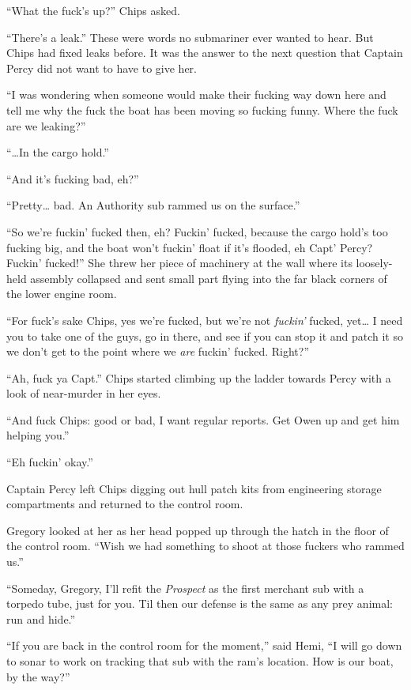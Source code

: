 \documentclass[
]{scrbook}
\begin{document}
``What the fuck's up?'' Chips asked.

``There's a leak.'' These were words no submariner ever wanted to hear.
But Chips had fixed leaks before. It was the answer to the next question
that Captain Percy did not want to have to give her.

``I was wondering when someone would make their fucking way down here
and tell me why the fuck the boat has been moving so fucking funny.
Where the fuck are we leaking?''

``\ldots In the cargo hold.''

``And it's fucking bad, eh?''

``Pretty\ldots{} bad. An Authority sub rammed us on the surface.''

``So we're fuckin' fucked then, eh? Fuckin' fucked, because the cargo
hold's too fucking big, and the boat won't fuckin' float if it's
flooded, eh Capt' Percy? Fuckin' fucked!'' She threw her piece of
machinery at the wall where its loosely-held assembly collapsed and sent
small part flying into the far black corners of the lower engine room.

``For fuck's sake Chips, yes we're fucked, but we're not \emph{fuckin'}
fucked, yet\ldots{} I need you to take one of the guys, go in there, and
see if you can stop it and patch it so we don't get to the point where
we \emph{are} fuckin' fucked. Right?''

``Ah, fuck ya Capt.'' Chips started climbing up the ladder towards Percy
with a look of near-murder in her eyes.

``And fuck Chips: good or bad, I want regular reports. Get Owen up and
get him helping you.''

``Eh fuckin' okay.''

Captain Percy left Chips digging out hull patch kits from engineering
storage compartments and returned to the control room.

Gregory looked at her as her head popped up through the hatch in the
floor of the control room. ``Wish we had something to shoot at those
fuckers who rammed us.''

``Someday, Gregory, I'll refit the \emph{Prospect} as the first merchant
sub with a torpedo tube, just for you. Til then our defense is the same
as any prey animal: run and hide.''

``If you are back in the control room for the moment,'' said Hemi, ``I
will go down to sonar to work on tracking that sub with the ram's
location. How is our boat, by the way?''
\end{document}
